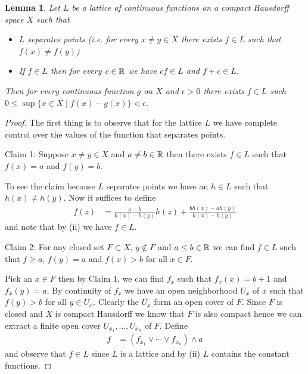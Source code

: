 \documentclass{amsart}
\newtheorem{lem}[thm]{Lemma}
\theoremstyle{remark}
\theoremstyle{definition}
\begin{document}
\begin{lem}Let $L$ be a lattice of continuous functions on a compact
  Hausdorff space $X$ such that 
\begin{itemize}
\item[(i)]$L$ separates points (i.e. for every $x \neq y \in X$ there
  exists $f \in L$ such that $f(x) \neq f(y)$)
\item[(ii)]If $f \in L$ then for every $c \in \mathbb{R}$ we have $cf \in
  L$ and $f + c \in L$.
\end{itemize}
Then for every continuous function $g$ on $X$ and $\epsilon > 0$ there
exists $f \in L$ such $0 \leq \sup \lbrace x \in X \mid f(x) - g(x)
\rbrace < \epsilon$.
\end{lem}
\begin{proof}
The first thing is to observe that for the lattice $L$ we have
complete control over the values of the function that separates points.

Claim 1: Suppose $x \neq y \in X$ and $a \neq b \in \mathbb{R}$ then
there exists $f \in L$ such that $f(x) = a$ and $f(y) = b$.

To see the claim because $L$ separates points we have an $h \in L$
such that $h(x) \neq h(y)$.  Now it suffices to define
\begin{align*}
f(z) &= \frac{a -b}{h(x) - h(y)} h(z) + \frac{b h(x) -a h(y) }{h(x) - h(y)} 
\end{align*}
and note that by (ii) we have $f \in L$.

Claim 2: For any closed set $F \subset X$, $y \notin F$ and $a \leq b
\in \mathbb{R}$ we can find $f \in L$ such that $f \geq a$, $f(y) = a$ and
$f(x) > b$ for all $x \in F$.

Pick an $x \in F$ then by Claim 1, we can find $f_x$ such that $f_x(x)
= b+1$ and $f_x(y) = a$.  By continuity of $f_x$ we have an open
neighborhood $U_x$ of $x$ such that $f(y) > b$ for all $y \in U_x$.
Clearly the $U_x$ form an open cover of $F$.
Since $F$ is closed and $X$ is compact Hausdorff we know that $F$ is
also compact hence we can extract a finite open cover $U_{x_1},
\dotsc,U_{x_n}$ of $F$.  Define
\begin{align*}
f &= (f_{x_1} \vee \cdots \vee f_{x_n}) \wedge a
\end{align*}
and observe that $f \in L$ since $L$ is a lattice and by (ii) $L$
contains the constant functions.


\end{proof}
\end{document}
